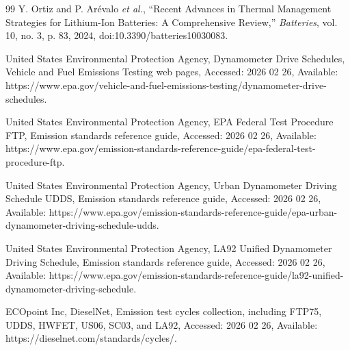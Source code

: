 \documentclass{article}
\begin{document}
\begin{thebibliography}{99}
Y. Ortiz and P. Ar{\'e}valo \textit{et al.}, ``Recent Advances in Thermal Management Strategies for Lithium-Ion Batteries: A Comprehensive Review,'' \textit{Batteries}, vol. 10, no. 3, p. 83, 2024, doi:10.3390/batteries10030083.

United States Environmental Protection Agency,
Dynamometer Drive Schedules,
Vehicle and Fuel Emissions Testing web pages,
Accessed: 2026 02 26,
Available: https://www.epa.gov/vehicle-and-fuel-emissions-testing/dynamometer-drive-schedules. %

United States Environmental Protection Agency,
EPA Federal Test Procedure FTP,
Emission standards reference guide,
Accessed: 2026 02 26,
Available: https://www.epa.gov/emission-standards-reference-guide/epa-federal-test-procedure-ftp. %

United States Environmental Protection Agency,
Urban Dynamometer Driving Schedule UDDS,
Emission standards reference guide,
Accessed: 2026 02 26,
Available: https://www.epa.gov/emission-standards-reference-guide/epa-urban-dynamometer-driving-schedule-udds. %

United States Environmental Protection Agency,
LA92 Unified Dynamometer Driving Schedule,
Emission standards reference guide,
Accessed: 2026 02 26,
Available: https://www.epa.gov/emission-standards-reference-guide/la92-unified-dynamometer-driving-schedule. %

ECOpoint Inc, DieselNet,
Emission test cycles collection, including FTP75, UDDS, HWFET, US06, SC03, and LA92,
Accessed: 2026 02 26,
Available: https://dieselnet.com/standards/cycles/. %
\end{thebibliography}

\vfill
\end{document}
